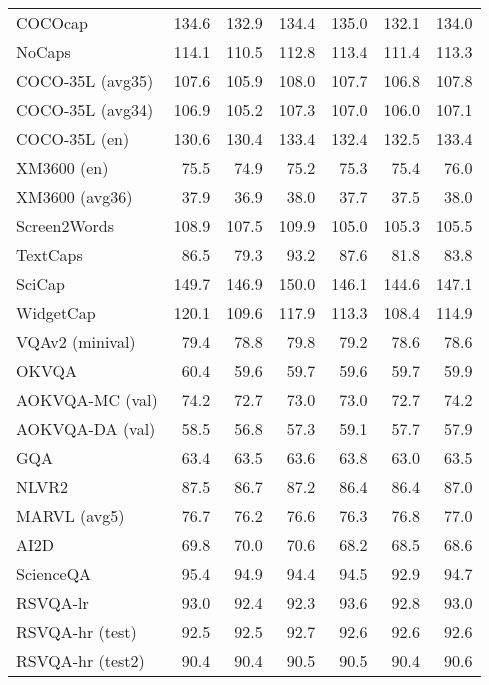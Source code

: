 {\begin{longtable}{l|rrr|rrr}
\endfoot  %

\bottomrule
\endlastfoot %

COCOcap & 134.6 & 132.9 & 134.4 & 135.0 & 132.1 & 134.0 \\
NoCaps & 114.1 & 110.5 & 112.8 & 113.4 & 111.4 & 113.3 \\
COCO-35L (avg35) & 107.6 & 105.9 & 108.0 & 107.7 & 106.8 & 107.8 \\
COCO-35L (avg34) & 106.9 & 105.2 & 107.3 & 107.0 & 106.0 & 107.1 \\
COCO-35L (en) & 130.6 & 130.4 & 133.4 & 132.4 & 132.5 & 133.4 \\
XM3600 (en) & 75.5 & 74.9 & 75.2 & 75.3 & 75.4 & 76.0 \\
XM3600 (avg36) & 37.9 & 36.9 & 38.0 & 37.7 & 37.5 & 38.0 \\
Screen2Words & 108.9 & 107.5 & 109.9 & 105.0 & 105.3 & 105.5 \\
TextCaps & 86.5 & 79.3 & 93.2 & 87.6 & 81.8 & 83.8 \\
SciCap & 149.7 & 146.9 & 150.0 & 146.1 & 144.6 & 147.1 \\
WidgetCap & 120.1 & 109.6 & 117.9 & 113.3 & 108.4 & 114.9 \\
VQAv2 (minival) & 79.4 & 78.8 & 79.8 & 79.2 & 78.6 & 78.6 \\
OKVQA & 60.4 & 59.6 & 59.7 & 59.6 & 59.7 & 59.9 \\
AOKVQA-MC (val) & 74.2 & 72.7 & 73.0 & 73.0 & 72.7 & 74.2 \\
AOKVQA-DA (val) & 58.5 & 56.8 & 57.3 & 59.1 & 57.7 & 57.9 \\
GQA & 63.4 & 63.5 & 63.6 & 63.8 & 63.0 & 63.5 \\
NLVR2 & 87.5 & 86.7 & 87.2 & 86.4 & 86.4 & 87.0 \\
MARVL (avg5) & 76.7 & 76.2 & 76.6 & 76.3 & 76.8 & 77.0 \\
AI2D & 69.8 & 70.0 & 70.6 & 68.2 & 68.5 & 68.6 \\
ScienceQA & 95.4 & 94.9 & 94.4 & 94.5 & 92.9 & 94.7 \\
RSVQA-lr & 93.0 & 92.4 & 92.3 & 93.6 & 92.8 & 93.0 \\
RSVQA-hr (test) & 92.5 & 92.5 & 92.7 & 92.6 & 92.6 & 92.6 \\
RSVQA-hr (test2) & 90.4 & 90.4 & 90.5 & 90.5 & 90.4 & 90.6 \\

\end{longtable}}
